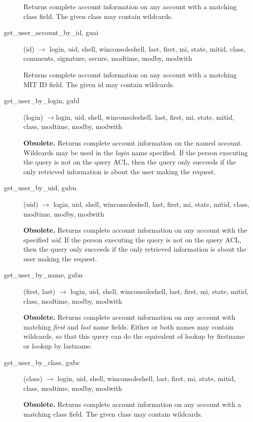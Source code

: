 \documentclass{article}
\begin{document}
\begin{description}
Returns complete account information on any account with a matching
class field.  The given class may contain wildcards.

\item[get\_user\_account\_by\_id, guai](id) $\rightarrow$ login, uid,
shell, winconsoleshell, last, first,
mi, state, mitid, class, comments, signature, secure, modtime, modby, modwith

Returns complete account information on any account with a matching
MIT ID field.  The given id may contain wildcards.

\item[get\_user\_by\_login, gubl](login) $\rightarrow$login, uid, shell,
winconsoleshell, last, first, mi, state, mitid, class, modtime, modby, modwith

{\bf Obsolete.}  Returns complete account information on the named
account.  Wildcards may be used in the {\em login} name specified.  If
the person executing the query is not on the query ACL, then the query
only succeeds if the only retrieved information is about the user
making the request.

\item[get\_user\_by\_uid, gubu](uid) $\rightarrow$ login, uid, shell,
winconsoleshell, last, first, mi,
state, mitid, class, modtime, modby, modwith

{\bf Obsolete.}  Returns complete account information on any account
with the specified {\em uid}.  If the person executing the query is not
on the query ACL, then the query only succeeds if the only retrieved
information is about the user making the request.

\item[get\_user\_by\_name, gubn](first, last) $\rightarrow$ login, uid, shell,
winconsoleshell, last, first, mi, state, mitid, class, modtime, modby, modwith

{\bf Obsolete.}  Returns complete account information on any account
with matching {\em first} and {\em last} name fields.  Either or both
names may contain wildcards, so that this query can do the equivalent
of lookup by firstname or lookup by lastname.

\item[get\_user\_by\_class, gubc](class) $\rightarrow$ login, uid,
shell, winconsoleshell, last,
first, mi, state, mitid, class, modtime, modby, modwith

{\bf Obsolete.}  Returns complete account information on any account
with a matching class field.  The given class may contain wildcards.


\end{description}
\end{document}
